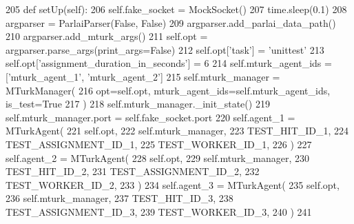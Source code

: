 \begin{DoxyCode}
205     \textcolor{keyword}{def }setUp(self):
206         self.fake\_socket = MockSocket()
207         time.sleep(0.1)
208         argparser = ParlaiParser(\textcolor{keyword}{False}, \textcolor{keyword}{False})
209         argparser.add\_parlai\_data\_path()
210         argparser.add\_mturk\_args()
211         self.opt = argparser.parse\_args(print\_args=\textcolor{keyword}{False})
212         self.opt[\textcolor{stringliteral}{'task'}] = \textcolor{stringliteral}{'unittest'}
213         self.opt[\textcolor{stringliteral}{'assignment\_duration\_in\_seconds'}] = 6
214         self.mturk\_agent\_ids = [\textcolor{stringliteral}{'mturk\_agent\_1'}, \textcolor{stringliteral}{'mturk\_agent\_2'}]
215         self.mturk\_manager = MTurkManager(
216             opt=self.opt, mturk\_agent\_ids=self.mturk\_agent\_ids, is\_test=\textcolor{keyword}{True}
217         )
218         self.mturk\_manager.\_init\_state()
219         self.mturk\_manager.port = self.fake\_socket.port
220         self.agent\_1 = MTurkAgent(
221             self.opt,
222             self.mturk\_manager,
223             TEST\_HIT\_ID\_1,
224             TEST\_ASSIGNMENT\_ID\_1,
225             TEST\_WORKER\_ID\_1,
226         )
227         self.agent\_2 = MTurkAgent(
228             self.opt,
229             self.mturk\_manager,
230             TEST\_HIT\_ID\_2,
231             TEST\_ASSIGNMENT\_ID\_2,
232             TEST\_WORKER\_ID\_2,
233         )
234         self.agent\_3 = MTurkAgent(
235             self.opt,
236             self.mturk\_manager,
237             TEST\_HIT\_ID\_3,
238             TEST\_ASSIGNMENT\_ID\_3,
239             TEST\_WORKER\_ID\_3,
240         )
241 
\end{DoxyCode}
\mbox{\label{classparlai_1_1mturk_1_1core_1_1legacy__2018_1_1test_1_1test__mturk__manager_1_1TestMTurkManagerUnitFunctions_a3e2ee2af169b9c741c4cdb5f033b1ff3}} 
